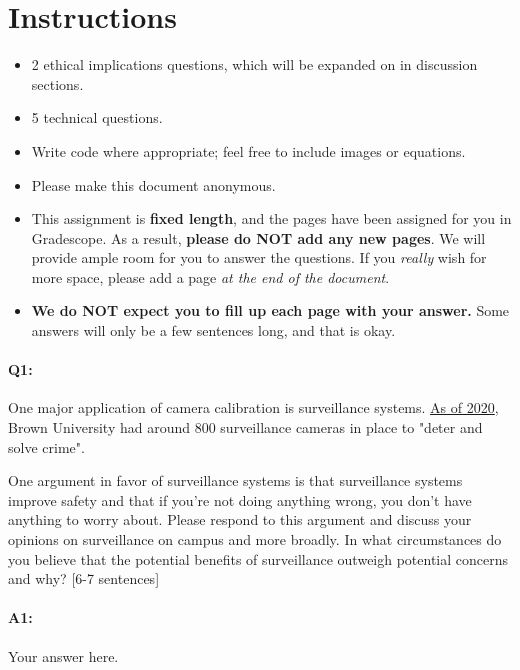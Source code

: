 \maketitle
\vspace{-2cm}
\thispagestyle{fancy}

\section*{Instructions}
\begin{itemize}
  \item 2 ethical implications questions, which will be expanded on in discussion sections.
  \item 5 technical questions.
  \item Write code where appropriate; feel free to include images or equations.
  \item Please make this document anonymous.
  \item This assignment is \textbf{fixed length}, and the pages have been assigned for you in Gradescope. As a result, \textbf{please do NOT add any new pages}. We will provide ample room for you to answer the questions. If you \emph{really} wish for more space, please add a page \emph{at the end of the document}.
  \item \textbf{We do NOT expect you to fill up each page with your answer.} Some answers will only be a few sentences long, and that is okay.
\end{itemize}



\pagebreak 
\paragraph{Q1:} One major application of camera calibration is surveillance systems. \href{https://www.browndailyherald.com/article/2020/02/cameras-installed-in-hegeman-hall}{As of 2020}, Brown University had around 800 surveillance cameras in place to "deter and solve crime". 

One argument in favor of surveillance systems is that surveillance systems improve safety and that if you're not doing anything wrong, you don't have anything to worry about. Please respond to this argument and discuss your opinions on surveillance on campus and more broadly. In what circumstances do you believe that the potential benefits of surveillance outweigh potential concerns and why? [6-7 sentences]

\paragraph{A1:} Your answer here.
\pagebreak
